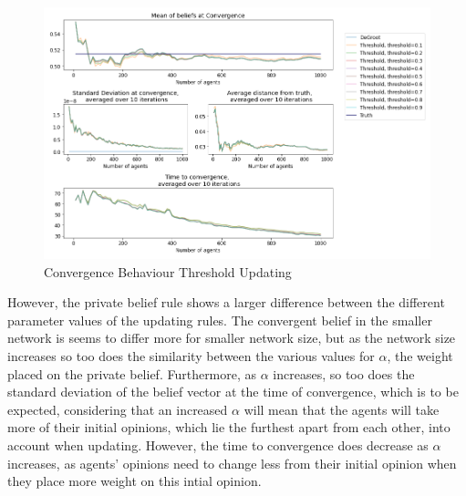 \documentclass{article}
\begin{document}
\begin{center}
    \begin{figure}[!htbp]
        \centering
        \includegraphics[width=1.2\textwidth]{ThesisKI/Images/WisdomThreshold.png}
        \caption{Convergence Behaviour Threshold Updating}
        \label{coop:threshold}
    \end{figure}
\end{center}

\newpage

However, the private belief rule shows a larger difference between the different parameter values of the updating rules. The convergent belief in the smaller network is seems to differ more for smaller network size, but as the network size increases so too does the similarity between the various values for $\alpha$, the weight placed on the private belief.
Furthermore, as $\alpha$ increases, so too does the standard deviation of the belief vector at the time of convergence, which is to be expected, considering that an increased $\alpha$ will mean that the agents will take more of their initial opinions, which lie the furthest apart from each other, into account when updating. However, the time to convergence does decrease as $\alpha$ increases, as agents' opinions need to change less from their initial opinion when they place more weight on this intial opinion.
\end{document}
